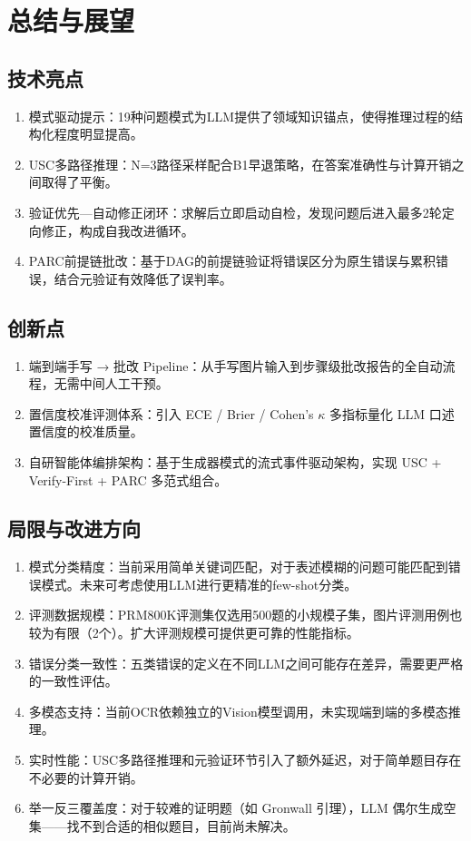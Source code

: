 \documentclass[12pt,a4paper]{ctexart}
\begin{document}
\section{总结与展望}

\subsection{技术亮点}

\begin{enumerate}[nosep]
  \item 模式驱动提示：19种问题模式为LLM提供了领域知识锚点，使得推理过程的结构化程度明显提高。
  \item USC多路径推理：N=3路径采样配合B1早退策略，在答案准确性与计算开销之间取得了平衡。
  \item 验证优先—自动修正闭环：求解后立即启动自检，发现问题后进入最多2轮定向修正，构成自我改进循环。
  \item PARC前提链批改：基于DAG的前提链验证将错误区分为原生错误与累积错误，结合元验证有效降低了误判率。
\end{enumerate}

\subsection{创新点}

\begin{enumerate}[nosep]
  \item 端到端手写 → 批改 Pipeline：从手写图片输入到步骤级批改报告的全自动流程，无需中间人工干预。
  \item 置信度校准评测体系：引入 ECE / Brier / Cohen's $\kappa$ 多指标量化 LLM 口述置信度的校准质量。
  \item 自研智能体编排架构：基于生成器模式的流式事件驱动架构，实现 USC + Verify-First + PARC 多范式组合。
\end{enumerate}

\subsection{局限与改进方向}

\begin{enumerate}[nosep]
  \item 模式分类精度：当前采用简单关键词匹配，对于表述模糊的问题可能匹配到错误模式。未来可考虑使用LLM进行更精准的few-shot分类。
  \item 评测数据规模：PRM800K评测集仅选用500题的小规模子集，图片评测用例也较为有限（2个）。扩大评测规模可提供更可靠的性能指标。
  \item 错误分类一致性：五类错误的定义在不同LLM之间可能存在差异，需要更严格的一致性评估。
  \item 多模态支持：当前OCR依赖独立的Vision模型调用，未实现端到端的多模态推理。
  \item 实时性能：USC多路径推理和元验证环节引入了额外延迟，对于简单题目存在不必要的计算开销。
  \item 举一反三覆盖度：对于较难的证明题（如 Gronwall 引理），LLM 偶尔生成空集——找不到合适的相似题目，目前尚未解决。
\end{enumerate}
\end{document}
